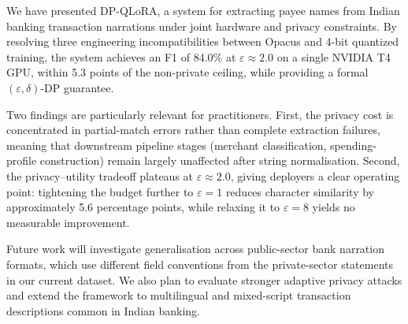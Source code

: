 \documentclass[conference]{IEEEtran}
\begin{document}
We have presented DP-QLoRA, a system for extracting payee names from Indian banking transaction narrations under joint hardware and privacy constraints. By resolving three engineering incompatibilities between Opacus and 4-bit quantized training, the system achieves an F1 of 84.0\% at $\varepsilon \approx 2.0$ on a single NVIDIA T4 GPU, within 5.3 points of the non-private ceiling, while providing a formal $(\varepsilon, \delta)$-DP guarantee.

Two findings are particularly relevant for practitioners. First, the privacy cost is concentrated in partial-match errors rather than complete extraction failures, meaning that downstream pipeline stages (merchant classification, spending-profile construction) remain largely unaffected after string normalisation. Second, the privacy--utility tradeoff plateaus at $\varepsilon \approx 2.0$, giving deployers a clear operating point: tightening the budget further to $\varepsilon = 1$ reduces character similarity by approximately 5.6 percentage points, while relaxing it to $\varepsilon = 8$ yields no measurable improvement.

Future work will investigate generalisation across public-sector bank narration formats, which use different field conventions from the private-sector statements in our current dataset. We also plan to evaluate stronger adaptive privacy attacks and extend the framework to multilingual and mixed-script transaction descriptions common in Indian banking.
\end{document}
